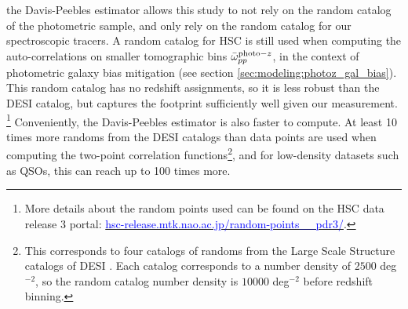 the Davis-Peebles estimator allows this study to not rely on the random catalog of the photometric sample, and only rely on the random catalog for our spectroscopic tracers. A random catalog for HSC is still used when computing the auto-correlations on smaller tomographic bins $\bar{\omega}_{pp}^{\mathrm{photo}-z}$, in the context of photometric galaxy bias mitigation (see section  \ref{sec:modeling:photoz_gal_bias}). This random catalog has no redshift assignments, so it is less robust than the DESI catalog, but captures the footprint sufficiently well given our measurement. \footnote{More details about the random points used can be found on the HSC data release 3 portal: \href{https://hsc-release.mtk.nao.ac.jp/doc/index.php/random-points__pdr3/}{\textcolor{blue}{hsc-release.mtk.nao.ac.jp/random-points\_\_pdr3/}}.} Conveniently, the Davis-Peebles estimator is also faster to compute. At least 10 times more randoms from the DESI catalogs than data points are used when computing the two-point correlation functions\footnote{This corresponds to four catalogs of randoms from the Large Scale Structure catalogs of DESI \cite{DESIConstructionLSS2024}. Each catalog corresponds to a number density of $2500$ deg$^{-2}$, so the random catalog number density is $10000$ deg$^{-2}$ before redshift binning.}, and for low-density datasets such as QSOs, this can reach up to 100 times more. %